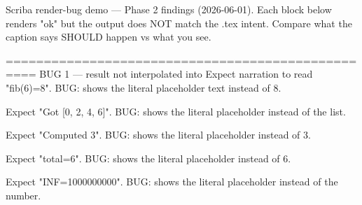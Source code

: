 Scriba render-bug demo — Phase 2 findings (2026-06-01). Each block below renders "ok" but the output does NOT match the .tex intent. Compare what the caption says SHOULD happen vs what you see.

==================================================
BUG 1 — \compute result not interpolated into \narrate
Expect narration to read "fib(6)=8". BUG: shows the literal placeholder text instead of 8.

\begin{animation}[id="b1a", label="compute recursion"]
\step
{}
\end{animation}

Expect "Got [0, 2, 4, 6]". BUG: shows the literal placeholder instead of the list.

\begin{animation}[id="b1b", label="compute comprehension"]
\step
{}
\end{animation}

Expect "Computed 3". BUG: shows the literal placeholder instead of 3.

\begin{animation}[id="b1c", label="compute def/for/if"]
\step
{}
\end{animation}

Expect "total=6". BUG: shows the literal placeholder instead of 6.

\begin{animation}[id="b1d", label="compute indented body"]
\step
{}
\end{animation}

Expect "INF=1000000000". BUG: shows the literal placeholder instead of the number.

\begin{animation}[id="b1e", label="compute int pow"]
\step
{}
\end{animation}

